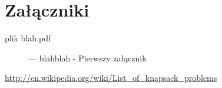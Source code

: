 \documentclass[a4paper,12pt,notitlepage]{mwrep}
\begin{document}
\addtocounter{page}{-1}

\appendix
\chapter*{Załączniki}
\begin{description}
	\item[plik blah.pdf]	 --- blahblah - Pierwszy załącznik
\end{description}

\begin{thebibliography}{9}

	\href{http://en.wikipedia.org/wiki/List_of_knapsack_problems}{http://en.wikipedia.org/wiki/List\_of\_knapsack\_problems}

\end{thebibliography}


\listoffigures

\listoftables

\label{LastPage}
\end{document}
